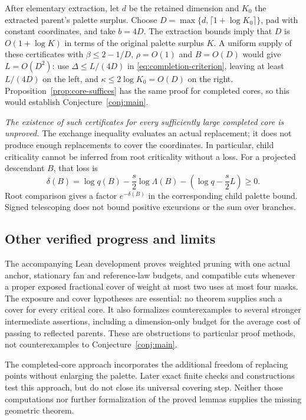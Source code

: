 \documentclass[11pt]{amsart}
\theoremstyle{definition}
\theoremstyle{remark}
\begin{document}
After elementary extraction, let $d$ be the retained dimension and $K_0$ the extracted parent's palette surplus. Choose $D=\max\{d,\lceil1+\log K_0\rceil\}$, pad with constant coordinates, and take $b=4D$. The extraction bounds imply that $D$ is $O(1+\log K)$ in terms of the original palette surplus $K$. A uniform supply of these certificates with $\beta\le2-1/D$, $\rho=O(1)$ and $B=O(D)$ would give $L=O(D^2)$: use $\Delta\le L/(4D)$ in \eqref{eq:completion-criterion}, leaving at least $L/(4D)$ on the left, and $\kappa\le2\log K_0=O(D)$ on the right. Proposition~\ref{prop:core-suffices} has the same proof for completed cores, so this would establish Conjecture~\ref{conj:main}.

\emph{The existence of such certificates for every sufficiently large completed core is unproved.} The exchange inequality evaluates an actual replacement; it does not produce enough replacements to cover the coordinates. In particular, child criticality cannot be inferred from root criticality without a loss. For a projected descendant $B$, that loss is
\[
\delta(B)=\log q(B)-\frac{s}{2}\log\Lambda(B)
              -\left(\log q-\frac{s}{2}L\right)\ge0.
\]
Root comparison gives a factor $e^{-\delta(B)}$ in the corresponding child palette bound. Signed telescoping does not bound positive excursions or the sum over branches.

\subsection*{Other verified progress and limits}
The accompanying Lean development proves weighted pruning with one actual anchor, stationary fan and reference-law budgets, and compatible cuts whenever a proper exposed fractional cover of weight at most two uses at most four masks. The exposure and cover hypotheses are essential: no theorem supplies such a cover for every critical core. It also formalizes counterexamples to several stronger intermediate assertions, including a dimension-only budget for the average cost of passing to reflected parents. These are obstructions to particular proof methods, not counterexamples to Conjecture~\ref{conj:main}.

The completed-core approach incorporates the additional freedom of replacing points without enlarging the palette. Later exact finite checks and constructions test this approach, but do not close its universal covering step. Neither those computations nor further formalization of the proved lemmas supplies the missing geometric theorem.
\end{document}
